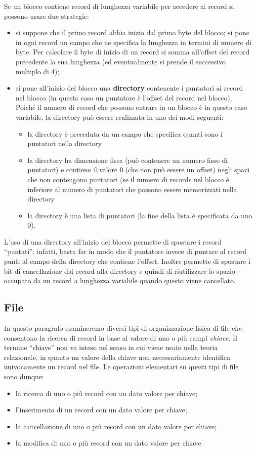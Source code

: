 Se un blocco contiene record di lunghezza variabile per accedere ai record si possono usare due
strategie:
\begin{itemize}
 \item si suppone che il primo record abbia inizio dal primo byte del blocco; si pone in ogni record un
campo che ne specifica la lunghezza in termini di numero di byte. Per calcolare il byte di inizio
di un record si somma all'offset del record precedente la sua lunghezza (ed eventualmente si
prende il successivo multiplo di 4);
 \item si pone all'inizio del blocco una \textbf{directory} contenente i puntatori ai record nel blocco 
 (in questo caso un puntatore è l'offset del record nel blocco). Poiché il numero di record che possono
entrare in un blocco è in questo caso variabile, la directory può essere realizzata in uno dei modi
seguenti:
\begin{itemize}
 \item la directory è preceduta da un campo che specifica quanti sono i puntatori nella directory
 \item la directory ha dimensione fissa (può contenere un numero fisso di puntatori) e contiene il
valore 0 (che non può essere un offset) negli spazi che non contengono puntatori (se il
numero di records nel blocco è inferiore al numero di puntatori che possono essere
memorizzati nella directory
\item la directory è una lista di puntatori (la fine della lista è specificata da uno 0).
\end{itemize}
\end{itemize}
L'uso di una directory all'inizio del blocco permette di spostare i record ``puntati''; infatti, basta 
far in modo che il puntatore invece di puntare al record punti al campo della directory che contiene
l'offset. Inoltre permette di spostare i bit di cancellazione dai record alla directory e quindi di
riutilizzare lo spazio occupato da un record a lunghezza variabile quando questo viene cancellato.

\subsection{File}
In questo paragrafo esamineremo diversi tipi di organizzazione fisica di file che consentono la
ricerca di record in base al valore di uno o più campi \emph{chiave}. Il termine ``chiave'' non va inteso nel
senso in cui viene usato nella teoria relazionale, in quanto un valore della chiave non necessariamente 
identifica univocamente un record nel file.
Le operazioni elementari su questi tipi di file sono dunque:
\begin{itemize}
 \item la ricerca di uno o più record con un dato valore per chiave;
 \item l'inserimento di un record con un dato valore per chiave;
 \item la cancellazione di uno o più record con un dato valore per chiave;
 \item la modifica di uno o più record con un dato valore per chiave. 
\end{itemize}

